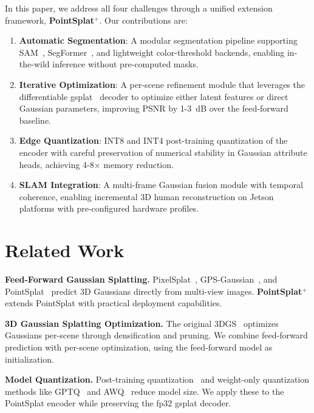 \documentclass[10pt,twocolumn,letterpaper]{article}
\newcommand{\ours}{\textbf{PointSplat$^+$}}
\begin{document}
In this paper, we address all four challenges through a unified extension
framework, \ours{}. Our contributions are:

\begin{enumerate}[leftmargin=*]
    \item \textbf{Automatic Segmentation}: A modular segmentation pipeline
    supporting SAM~\cite{kirillov2023segment}, SegFormer~\cite{xie2021segformer},
    and lightweight color-threshold backends, enabling in-the-wild inference
    without pre-computed masks.
    \item \textbf{Iterative Optimization}: A per-scene refinement module
    that leverages the differentiable gsplat~\cite{ye2024gsplat} decoder
    to optimize either latent features or direct Gaussian parameters,
    improving PSNR by 1-3~dB over the feed-forward baseline.
    \item \textbf{Edge Quantization}: INT8 and INT4 post-training
    quantization of the encoder with careful preservation of numerical
    stability in Gaussian attribute heads, achieving 4-8$\times$ memory
    reduction.
    \item \textbf{SLAM Integration}: A multi-frame Gaussian fusion module
    with temporal coherence, enabling incremental 3D human reconstruction
    on Jetson platforms with pre-configured hardware profiles.
\end{enumerate}

\section{Related Work}
\label{sec:related}

\textbf{Feed-Forward Gaussian Splatting.}
PixelSplat~\cite{charatan2024pixelsplat}, GPS-Gaussian~\cite{zheng2024gps},
and PointSplat~\cite{guo2026pointsplat} predict 3D Gaussians directly from
multi-view images. \ours{} extends PointSplat with practical deployment
capabilities.

\textbf{3D Gaussian Splatting Optimization.}
The original 3DGS~\cite{kerbl3Dgaussians} optimizes Gaussians per-scene
through densification and pruning. We combine feed-forward prediction
with per-scene optimization, using the feed-forward model as initialization.

\textbf{Model Quantization.}
Post-training quantization~\cite{nagel2021white} and weight-only quantization
methods like GPTQ~\cite{frantar2023gptq} and AWQ~\cite{lin2024awq} reduce
model size. We apply these to the PointSplat encoder while preserving the
fp32 gsplat decoder.
\end{document}
